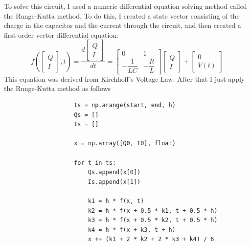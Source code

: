 \documentclass{report}
\begin{document}
                To solve this circuit, I used a numeric differential equation solving method called the Runge-Kutta method. To do this, I created a state vector consisting of the charge in the capacitor and the current through the circuit, and then created a first-order vector differential equation:
                \begin{equation}
                    f(\begin{bmatrix}
                        Q \\
                        I
                    \end{bmatrix}, t) = 
                    \dfrac{d\begin{bmatrix}
                        Q \\
                        I
                    \end{bmatrix}}{dt} = \begin{bmatrix}
                        0 & 1 \\
                        -\dfrac{1}{LC} & -\dfrac{R}{L}
                    \end{bmatrix}\begin{bmatrix}
                        Q \\
                        I
                    \end{bmatrix} + \begin{bmatrix}
                        0 \\
                        V(t)
                    \end{bmatrix}
                \end{equation} 
                This equation was derived from Kirchhoff's Voltage Law. After that I just apply the Runge-Kutta method as follows
                \begin{lstlisting}
                    ts = np.arange(start, end, h)
                    Qs = []
                    Is = []

                    x = np.array([Q0, I0], float)

                    for t in ts:
                        Qs.append(x[0])
                        Is.append(x[1])

                        k1 = h * f(x, t)
                        k2 = h * f(x + 0.5 * k1, t + 0.5 * h)
                        k3 = h * f(x + 0.5 * k2, t + 0.5 * h)
                        k4 = h * f(x + k3, t + h)
                        x += (k1 + 2 * k2 + 2 * k3 + k4) / 6
                \end{lstlisting}
\end{document}
